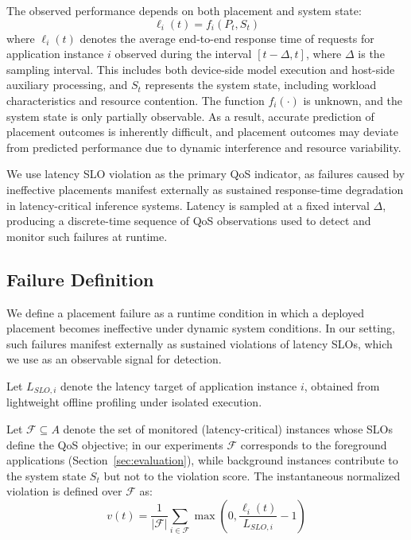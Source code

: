 \documentclass[conference]{IEEEtran}
\begin{document}
The observed performance depends on both placement and system state:
\begin{equation}
\ell_i(t) = f_i(P_t, S_t)
\end{equation}
where $\ell_i(t)$ denotes the average end-to-end response time of requests for application instance $i$ observed during the interval $[t-\Delta, t]$, where $\Delta$ is the sampling interval. This includes both device-side model execution and host-side auxiliary processing, and $S_t$ represents the system state, including workload characteristics and resource contention.
The function $f_i(\cdot)$ is unknown, and the system state is only partially observable.
As a result, accurate prediction of placement outcomes is inherently difficult, and placement outcomes may deviate from predicted performance due to dynamic interference and resource variability.

We use latency SLO violation as the primary QoS indicator, as failures caused by ineffective placements manifest externally as sustained response-time degradation in latency-critical inference systems. Latency is sampled at a fixed interval $\Delta$, producing a discrete-time sequence of QoS observations used to detect and monitor such failures at runtime.


\subsection{Failure Definition}

We define a placement failure as a runtime condition in which a deployed placement becomes ineffective under dynamic system conditions. 
In our setting, such failures manifest externally as sustained violations of latency SLOs, which we use as an observable signal for detection.

Let $L_{SLO,i}$ denote the latency target of application instance $i$, obtained from lightweight offline profiling under isolated execution. 

Let $\mathcal{F} \subseteq A$ denote the set of monitored (latency-critical) instances whose SLOs define the QoS objective; in our experiments $\mathcal{F}$ corresponds to the foreground applications (Section~\ref{sec:evaluation}), while background instances contribute to the system state $S_t$ but not to the violation score. The instantaneous normalized violation is defined over $\mathcal{F}$ as:
\begin{equation}
v(t) = \frac{1}{|\mathcal{F}|} \sum_{i \in \mathcal{F}} \max\left(0, \frac{\ell_i(t)}{L_{SLO,i}} - 1 \right)
\end{equation}
\end{document}
